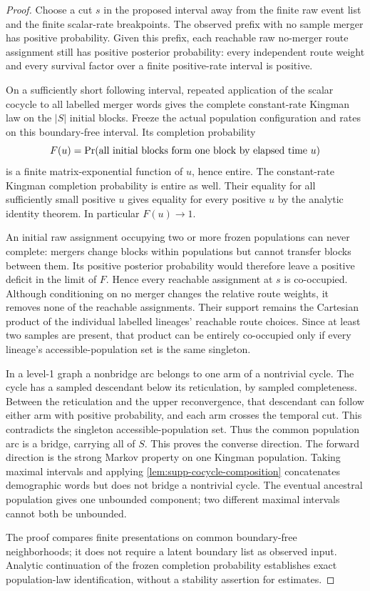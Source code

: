 \documentclass[11pt]{article}
\begin{document}
\begin{proof}
Choose a cut $s$ in the proposed interval away from the finite raw event list and the finite scalar-rate breakpoints.  The observed prefix with no sample merger has positive probability.  Given this prefix, each reachable raw no-merger route assignment still has positive posterior probability: every independent route weight and every survival factor over a finite positive-rate interval is positive.

On a sufficiently short following interval, repeated application of the scalar cocycle to all labelled merger words gives the complete constant-rate Kingman law on the $|S|$ initial blocks.  Freeze the actual population configuration and rates on this boundary-free interval.  Its completion probability
\[
F(u)=\Pr(\hbox{all initial blocks form one block by elapsed time }u)
\]
is a finite matrix-exponential function of $u$, hence entire.  The constant-rate Kingman completion probability is entire as well.  Their equality for all sufficiently small positive $u$ gives equality for every positive $u$ by the analytic identity theorem.  In particular $F(u)\longrightarrow1$.

An initial raw assignment occupying two or more frozen populations can never complete: mergers change blocks within populations but cannot transfer blocks between them.  Its positive posterior probability would therefore leave a positive deficit in the limit of $F$.  Hence every reachable assignment at $s$ is co-occupied.  Although conditioning on no merger changes the relative route weights, it removes none of the reachable assignments.  Their support remains the Cartesian product of the individual labelled lineages' reachable route choices.  Since at least two samples are present, that product can be entirely co-occupied only if every lineage's accessible-population set is the same singleton.

In a level-1 graph a nonbridge arc belongs to one arm of a nontrivial cycle.  The cycle has a sampled descendant below its reticulation, by sampled completeness.  Between the reticulation and the upper reconvergence, that descendant can follow either arm with positive probability, and each arm crosses the temporal cut.  This contradicts the singleton accessible-population set.  Thus the common population arc is a bridge, carrying all of $S$.  This proves the converse direction.  The forward direction is the strong Markov property on one Kingman population.  Taking maximal intervals and applying \cref{lem:supp-cocycle-composition} concatenates demographic words but does not bridge a nontrivial cycle.  The eventual ancestral population gives one unbounded component; two different maximal intervals cannot both be unbounded.

The proof compares finite presentations on common boundary-free neighborhoods; it does not require a latent boundary list as observed input.  Analytic continuation of the frozen completion probability establishes exact population-law identification, without a stability assertion for estimates.
\end{proof}
\end{document}
